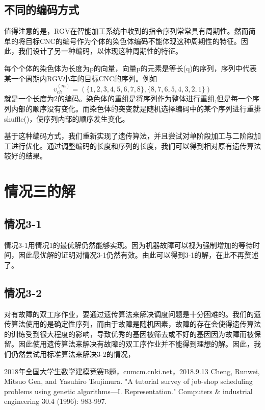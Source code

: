 \documentclass{cumcmthesis}
\begin{document}
	\subsection{不同的编码方式}
	
	值得注意的是，RGV在智能加工系统中收到的指令序列常常具有周期性。然而简单的将目标CNC的编号作为个体的染色体编码不能体现这种周期性的特征。因此，我们设计了另一种编码，以体现这种周期性的特征。
	
	每个个体的染色体为长度为p的向量，向量p的元素是等长(q)的序列，序列中代表某一个周期内RGV小车的目标CNC的序列。例如$$v_{ch}^{(m)} = (\{1,2,3,4,5,6,7,8\},\{8,7,6,5,4,3,2,1\})$$就是一个长度为2的编码。染色体的重组是将序列作为整体进行重组,但是每一个序列内部的顺序没有变化。而染色体的突变就是随机选择编码中的某个序列进行重排shuffle()，使序列内部的顺序发生变化。
	
	基于这种编码方式，我们重新实现了遗传算法，并且尝试对单阶段加工与二阶段加工进行优化。通过调整编码的长度和序列的长度，我们可以得到相对原有遗传算法较好的结果。

	\section{情况三的解}
	\subsection{情况3-1}
	情况3-1用情况1的最优解仍然能够实现。因为机器故障可以视为强制增加的等待时间，因此最优解的证明对情况3-1仍然有效。由此可以得到3-1的解，在此不再赘述了。
	\subsection{情况3-2}
	对有故障的双工序作业，要通过遗传算法来解决调度问题是十分困难的。我们的遗传算法使用的是确定性序列，而由于故障是随机因素，故障的存在会使得遗传算法的训练受到很大程度的影响，导致优秀的基因被筛去或不好的基因因为故障而被保留。因此使用遗传算法来解决有故障的双工序作业并不能得到理想的解。因此，我们仍然尝试用标准算法来解决3-2的情况，
	
	\begin{thebibliography}{9}
		 2018年全国大学生数学建模竞赛B题，cumcm.cnki.net，2018.9.13
		 Cheng, Runwei, Mitsuo Gen, and Yasuhiro Tsujimura. "A tutorial survey of job-shop scheduling problems using genetic algorithms—I. Representation." Computers \& industrial engineering 30.4 (1996): 983-997.
	\end{thebibliography}
	
\end{document}
